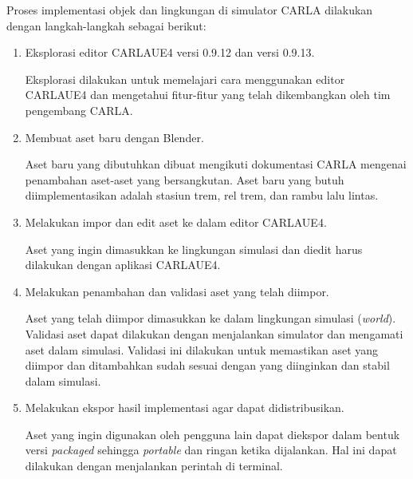 Proses implementasi objek dan lingkungan di simulator CARLA dilakukan dengan
langkah-langkah sebagai berikut:


\begin{enumerate}

	\item Eksplorasi editor CARLAUE4 versi 0.9.12 dan versi 0.9.13.

	Eksplorasi dilakukan untuk memelajari cara menggunakan editor CARLAUE4 dan
	mengetahui fitur-fitur yang telah dikembangkan oleh tim pengembang CARLA.

	\item Membuat aset baru dengan Blender.

	Aset baru yang dibutuhkan dibuat mengikuti dokumentasi CARLA mengenai
	penambahan aset-aset yang bersangkutan. Aset baru yang butuh
	diimplementasikan adalah stasiun trem, rel trem, dan rambu lalu lintas.

	\item Melakukan impor dan edit aset ke dalam editor CARLAUE4.

	Aset yang ingin dimasukkan ke lingkungan simulasi dan diedit harus dilakukan
	dengan aplikasi CARLAUE4.




	\item Melakukan penambahan dan validasi aset yang telah diimpor.

	Aset yang telah diimpor dimasukkan ke dalam lingkungan simulasi
	(\textit{world}). Validasi aset dapat dilakukan dengan menjalankan simulator
	dan mengamati aset dalam simulasi. Validasi ini dilakukan untuk memastikan
	aset yang diimpor dan ditambahkan sudah sesuai dengan yang diinginkan dan
	stabil dalam simulasi.

	\item Melakukan ekspor hasil implementasi agar dapat didistribusikan.

	Aset yang ingin digunakan oleh pengguna lain dapat diekspor dalam bentuk
	versi \textit{packaged} sehingga \textit{portable} dan ringan ketika
	dijalankan. Hal ini dapat dilakukan dengan menjalankan perintah di terminal.

\end{enumerate}
